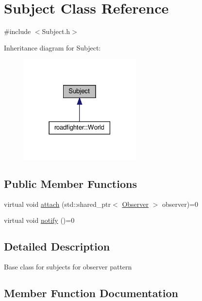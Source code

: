 \hypertarget{classSubject}{}\section{Subject Class Reference}
\label{classSubject}


{\ttfamily \#include $<$Subject.\+h$>$}



Inheritance diagram for Subject\+:\nopagebreak
\begin{figure}[H]
\begin{center}
\leavevmode
\includegraphics[width=174pt]{classSubject__inherit__graph}
\end{center}
\end{figure}
\subsection*{Public Member Functions}
\begin{DoxyCompactItemize}
\item 
virtual void \hyperlink{classSubject_a6d3186b9f59f044f0c946be2b06606d7}{attach} (std\+::shared\+\_\+ptr$<$ \hyperlink{classObserver}{Observer} $>$ observer)=0
\item 
virtual void \hyperlink{classSubject_aedd8aa6de28b18ef5880566de4294bfe}{notify} ()=0
\end{DoxyCompactItemize}


\subsection{Detailed Description}
Base class for subjects for observer pattern 

\subsection{Member Function Documentation}
\mbox{\label{classSubject_a6d3186b9f59f044f0c946be2b06606d7}} 
